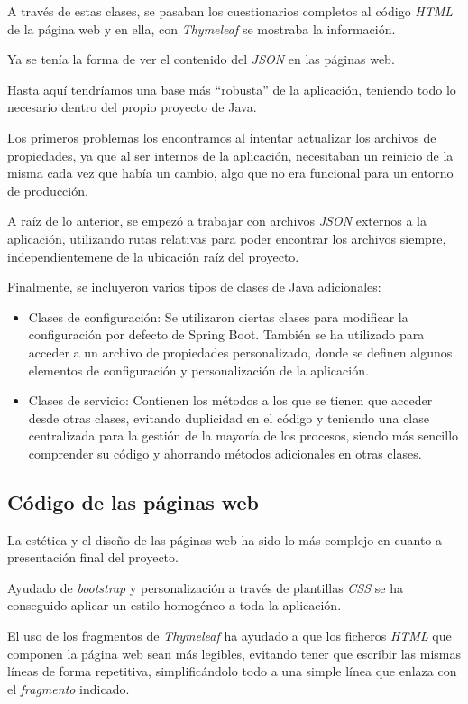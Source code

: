 A través de estas clases, se pasaban los cuestionarios completos al código \textit{HTML} de la página web y en ella, con \textit{Thymeleaf} se mostraba la información.

Ya se tenía la forma de ver el contenido del \textit{JSON} en las páginas web.

Hasta aquí tendríamos una base más ``robusta'' de la aplicación, teniendo todo lo necesario dentro del propio proyecto de Java.

Los primeros problemas los encontramos al intentar actualizar los archivos de propiedades, ya que al ser internos de la aplicación, necesitaban un reinicio de la misma cada vez que había un cambio, algo que no era funcional para un entorno de producción.

A raíz de lo anterior, se empezó a trabajar con archivos \textit{JSON} externos a la aplicación, utilizando rutas relativas para poder encontrar los archivos siempre, independientemene de la ubicación raíz del proyecto.

Finalmente, se incluyeron varios tipos de clases de Java adicionales:

 \begin{itemize}
	\item Clases de configuración: Se utilizaron ciertas clases para modificar la configuración por defecto de Spring Boot. También se ha utilizado para acceder a un archivo de propiedades personalizado, donde se definen algunos elementos de configuración y personalización de la aplicación.
	\item Clases de servicio: Contienen los métodos a los que se tienen que acceder desde otras clases, evitando duplicidad en el código y teniendo una clase centralizada para la gestión de la mayoría de los procesos, siendo más sencillo comprender su código y ahorrando métodos adicionales en otras clases.
\end{itemize}

\subsection{Código de las páginas web}

La estética y el diseño de las páginas web ha sido lo más complejo en cuanto a presentación final del proyecto.

Ayudado de \textit{bootstrap} y personalización a través de plantillas \textit{CSS} se ha conseguido aplicar un estilo homogéneo a toda la aplicación.

El uso de los fragmentos de \textit{Thymeleaf} ha ayudado a que los ficheros \textit{HTML} que componen la página web sean más legibles, evitando tener que escribir las mismas líneas de forma repetitiva, simplificándolo todo a una simple línea que enlaza con el \textit{fragmento} indicado.

